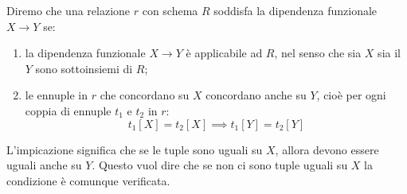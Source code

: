 Diremo che una relazione $r$ con schema $R$ soddisfa la dipendenza funzionale $X\to Y$ se:
\begin{enumerate}
    \item la dipendenza funzionale $X\to Y$ è applicabile ad $R$, nel senso che sia $X$ sia il $Y$ sono sottoinsiemi di $R$;
    \item le ennuple in $r$ che concordano su $X$ concordano anche su $Y$, cioè per ogni coppia di ennuple $t_1$ e $t_2$ in $r$:
    \begin{equation*}
        t_1[X] = t_2[X] \implies t_1[Y] = t_2[Y]
    \end{equation*}
\end{enumerate}

\begin{osservation}
    L'impicazione significa che se le tuple sono uguali su $X$, allora devono essere uguali anche su $Y$. Questo vuol dire che se non ci sono tuple uguali su $X$ la condizione è comunque verificata.
\end{osservation}
